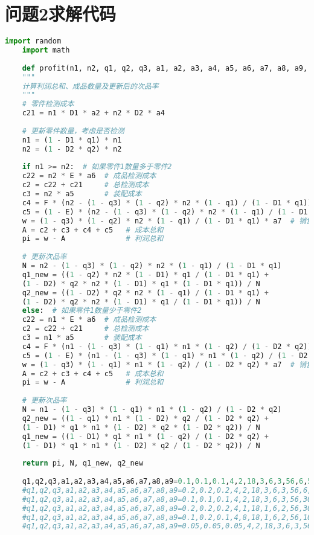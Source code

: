 \documentclass[withoutpreface,bwprint]{cumcmthesis} %
\begin{document}
 \section{问题2求解代码}
 \begin{lstlisting}[language=python]
 	import random
 	import math
 	
 	def profit(n1, n2, q1, q2, q3, a1, a2, a3, a4, a5, a6, a7, a8, a9, D1, D2, E, F):
 	"""
 	计算利润总和、成品数量及更新后的次品率
 	"""
 	# 零件检测成本
 	c21 = n1 * D1 * a2 + n2 * D2 * a4
 	
 	# 更新零件数量，考虑是否检测
 	n1 = (1 - D1 * q1) * n1
 	n2 = (1 - D2 * q2) * n2
 	
 	if n1 >= n2:  # 如果零件1数量多于零件2
 	c22 = n2 * E * a6  # 成品检测成本
 	c2 = c22 + c21     # 总检测成本
 	c3 = n2 * a5       # 装配成本
 	c4 = F * (n2 - (1 - q3) * (1 - q2) * n2 * (1 - q1) / (1 - D1 * q1)) * a9  # 拆解费用
 	c5 = (1 - E) * (n2 - (1 - q3) * (1 - q2) * n2 * (1 - q1) / (1 - D1 * q1)) * a8  # 调换成本
 	w = (1 - q3) * (1 - q2) * n2 * (1 - q1) / (1 - D1 * q1) * a7  # 销售额
 	A = c2 + c3 + c4 + c5   # 成本总和
 	pi = w - A              # 利润总和
 	
 	# 更新次品率
 	N = n2 - (1 - q3) * (1 - q2) * n2 * (1 - q1) / (1 - D1 * q1)
 	q1_new = ((1 - q2) * n2 * (1 - D1) * q1 / (1 - D1 * q1) +
 	(1 - D2) * q2 * n2 * (1 - D1) * q1 * (1 - D1 * q1)) / N
 	q2_new = ((1 - D2) * q2 * n2 * (1 - q1) / (1 - D1 * q1) +
 	(1 - D2) * q2 * n2 * (1 - D1) * q1 / (1 - D1 * q1)) / N
 	else:  # 如果零件1数量少于零件2
 	c22 = n1 * E * a6  # 成品检测成本
 	c2 = c22 + c21     # 总检测成本
 	c3 = n1 * a5       # 装配成本
 	c4 = F * (n1 - (1 - q3) * (1 - q1) * n1 * (1 - q2) / (1 - D2 * q2)) * a9  # 拆解费用
 	c5 = (1 - E) * (n1 - (1 - q3) * (1 - q1) * n1 * (1 - q2) / (1 - D2 * q2)) * a8  # 调换成本
 	w = (1 - q3) * (1 - q1) * n1 * (1 - q2) / (1 - D2 * q2) * a7  # 销售额
 	A = c2 + c3 + c4 + c5   # 成本总和
 	pi = w - A              # 利润总和
 	
 	# 更新次品率
 	N = n1 - (1 - q3) * (1 - q1) * n1 * (1 - q2) / (1 - D2 * q2)
 	q2_new = ((1 - q1) * n1 * (1 - D2) * q2 / (1 - D2 * q2) +
 	(1 - D1) * q1 * n1 * (1 - D2) * q2 * (1 - D2 * q2)) / N
 	q1_new = ((1 - D1) * q1 * n1 * (1 - q2) / (1 - D2 * q2) +
 	(1 - D1) * q1 * n1 * (1 - D2) * q2 / (1 - D2 * q2)) / N
 	
 	return pi, N, q1_new, q2_new
 	
 	q1,q2,q3,a1,a2,a3,a4,a5,a6,a7,a8,a9=0.1,0.1,0.1,4,2,18,3,6,3,56,6,5
 	#q1,q2,q3,a1,a2,a3,a4,a5,a6,a7,a8,a9=0.2,0.2,0.2,4,2,18,3,6,3,56,6,5
 	#q1,q2,q3,a1,a2,a3,a4,a5,a6,a7,a8,a9=0.1,0.1,0.1,4,2,18,3,6,3,56,30,5
 	#q1,q2,q3,a1,a2,a3,a4,a5,a6,a7,a8,a9=0.2,0.2,0.2,4,1,18,1,6,2,56,30,5
 	#q1,q2,q3,a1,a2,a3,a4,a5,a6,a7,a8,a9=0.1,0.2,0.1,4,8,18,1,6,2,56,10,5
 	#q1,q2,q3,a1,a2,a3,a4,a5,a6,a7,a8,a9=0.05,0.05,0.05,4,2,18,3,6,3,56,10,40
 	

\end{lstlisting}
\end{document}
